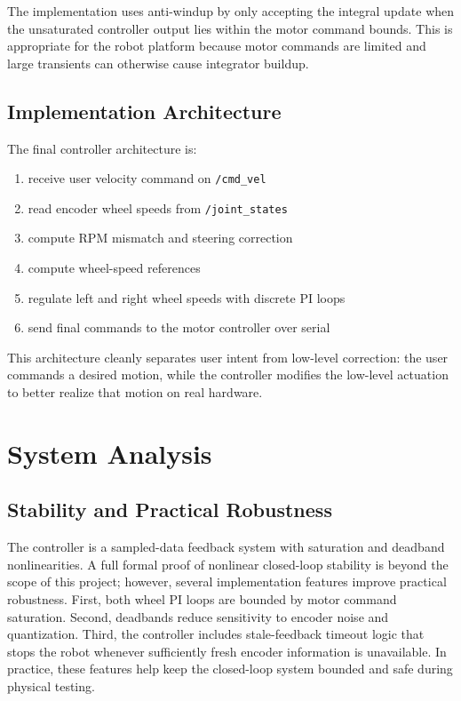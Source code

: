 \documentclass[conference]{IEEEtran}
\begin{document}
The implementation uses anti-windup by only accepting the integral update when the unsaturated controller output lies within the motor command bounds. This is appropriate for the robot platform because motor commands are limited and large transients can otherwise cause integrator buildup.

\subsection{Implementation Architecture}
The final controller architecture is:
\begin{enumerate}
\item receive user velocity command on \texttt{/cmd\_vel}
\item read encoder wheel speeds from \texttt{/joint\_states}
\item compute RPM mismatch and steering correction
\item compute wheel-speed references
\item regulate left and right wheel speeds with discrete PI loops
\item send final commands to the motor controller over serial
\end{enumerate}

This architecture cleanly separates user intent from low-level correction: the user commands a desired motion, while the controller modifies the low-level actuation to better realize that motion on real hardware.

\section{System Analysis}
\subsection{Stability and Practical Robustness}
The controller is a sampled-data feedback system with saturation and deadband nonlinearities. A full formal proof of nonlinear closed-loop stability is beyond the scope of this project; however, several implementation features improve practical robustness. First, both wheel PI loops are bounded by motor command saturation. Second, deadbands reduce sensitivity to encoder noise and quantization. Third, the controller includes stale-feedback timeout logic that stops the robot whenever sufficiently fresh encoder information is unavailable. In practice, these features help keep the closed-loop system bounded and safe during physical testing.
\end{document}
